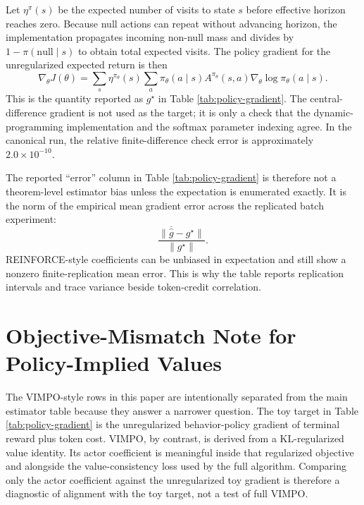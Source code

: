 \documentclass[11pt]{article}
\newcommand{\vimpo}{\textsc{VIMPO}}
\begin{document}
Let $\eta^\pi(s)$ be the expected number of visits to state $s$ before
effective horizon reaches zero. Because null actions can repeat without
advancing horizon, the implementation propagates incoming non-null mass and
divides by $1-\pi(\mathrm{null}\mid s)$ to obtain total expected visits. The
policy gradient for the unregularized expected return is then
\begin{equation}
\nabla_\theta J(\theta)=
\sum_s \eta^{\pi_\theta}(s)
\sum_a \pi_\theta(a\mid s)
A^{\pi_\theta}(s,a)
\nabla_\theta\log\pi_\theta(a\mid s).
\end{equation}
This is the quantity reported as $g^\star$ in Table
\ref{tab:policy-gradient}. The central-difference gradient is not used as the
target; it is only a check that the dynamic-programming implementation and the
softmax parameter indexing agree. In the canonical run, the relative
finite-difference check error is approximately $2.0\times 10^{-10}$.

The reported ``error'' column in Table \ref{tab:policy-gradient} is therefore
not a theorem-level estimator bias unless the expectation is enumerated
exactly. It is the norm of the empirical mean gradient error across the
replicated batch experiment:
\begin{equation}
\frac{\|\overline{\widehat g}-g^\star\|}{\|g^\star\|}.
\end{equation}
REINFORCE-style coefficients can be unbiased in expectation and still show a
nonzero finite-replication mean error. This is why the table reports
replication intervals and trace variance beside token-credit correlation.

\section{Objective-Mismatch Note for Policy-Implied Values}

The \vimpo-style rows in this paper are intentionally separated from the main
estimator table because they answer a narrower question. The toy target in
Table \ref{tab:policy-gradient} is the unregularized behavior-policy gradient
of terminal reward plus token cost. \vimpo, by contrast, is derived from a
KL-regularized value identity. Its actor coefficient is meaningful inside that
regularized objective and alongside the value-consistency loss used by the full
algorithm. Comparing only the actor coefficient against the unregularized
toy gradient is therefore a diagnostic of alignment with the toy target, not a
test of full \vimpo.
\end{document}
